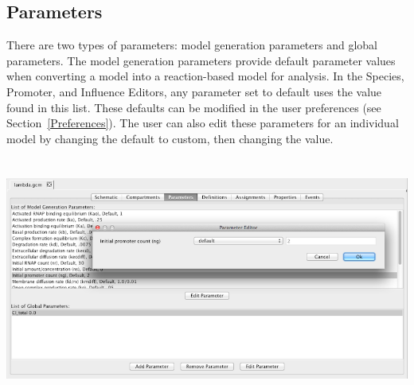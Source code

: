 \documentclass[titlepage,11pt]{article}
\begin{document}
\subsection{\label{Parameters}Parameters}

\noindent
There are two types of parameters: model generation parameters and global parameters.  The model generation parameters provide default parameter values when converting a model into a reaction-based model for analysis. 
In the Species, Promoter, and Influence Editors, any parameter set to default uses the value found in this list.  These defaults can be modified in the user preferences (see Section~\ref{Preferences}).  The user can also edit these parameters for an individual model by changing the default to custom, then changing the value.

\begin{center}
\includegraphics[height=80mm]{screenshots/GCMparam}
\end{center}

\end{document}
